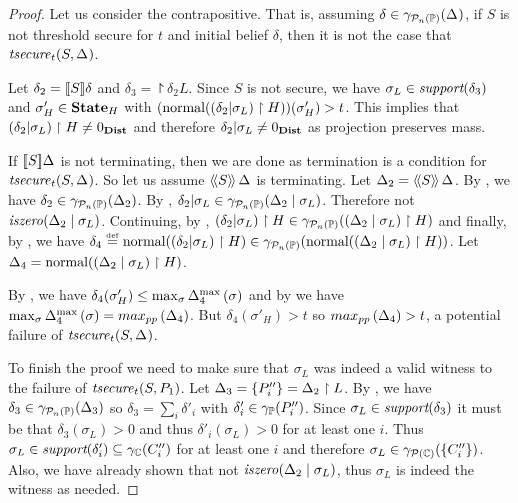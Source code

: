 \begin{proof} Let us consider the contrapositive. That is, assuming
  $ \delta \in \ppsconc{\pps{}} $, if $ S $ is not threshold secure for
  $ t $ and initial belief $ \delta $, then it is not the case that
  $ \abspolicy{S}{\pps{}}{t} $.

Let $ \delta_2 = \eval{S}{\delta} $ and $ \delta_3
= \project{\delta_2}{L} $. Since $ S $ is not secure, we have
$ \sigma_L \in \support{\delta_3} $ and
$ \sigma'_H \in \states_H $ with $
(\normal{\project{\paren{\dcond{\delta_2}{\sigma_L}}}{H}})(\sigma'_H) >
t $. This implies that
$ \project{\paren{\dcond{\delta_2}{\sigma_L}}}{H} \neq \distzero $ and
therefore $ \dcond{\delta_2}{\sigma_L} \neq \distzero $ as projection
preserves mass.

If $ \pevalp{S}{\pps{}} $ is not terminating, then we are done as
termination is a condition for $ \abspolicy{S}{\pps{}}{t} $. So let us
assume $ \abspevalp{S}{\pps{}} $ is terminating. Let $ \pps{2}
= \abspevalp{S}{\pps{}} $. By , we have
$ \delta_2 \in \ppsconc{\pps{2}} $. By ,
$ \dcond{\delta_2}{\sigma_L} \in \ppsconc{\absdcond{\pps{2}}{\sigma_L}}
$. Therefore not $ \iszero{\absdcond{\pps{2}}{\sigma_L}}
$. Continuing, by ,
$ \project{ \paren{\dcond{\delta_2}{\sigma_L}}}{H} \in \ppsconc{\project{\paren{\absdcond{\pps{2}}{\sigma_L}}}{H}}
$ and finally, by , we have
$ \delta_4 \defeq \normal{\project{\paren{\dcond{\delta_2}{\sigma_L}}}{H}} \in \ppsconc{\normal{\project{\paren{\absdcond{\pps{2}}{\sigma_L}}}{H}}}
$. Let $ \pps{4}
= \normal{\project{\paren{\absdcond{\pps{2}}{\sigma_L}}}{H}} $.

By , we have
$ \delta_4(\sigma'_H) \leq \max_{\sigma}\ppsprob{\pps{4}}{\sigma} $
and by  we have
$ \max_{\sigma}\ppsprob{\pps{4}}{\sigma} = \ppsmax{\pps{4}} $.  But
$ \delta_4(\sigma'_H) > t $ so $ \ppsmax{\pps{4}} > t $, a potential
failure of $\abspolicy{S}{\pps{}}{t} $.

To finish the proof we need to make sure that $ \sigma_L $ was indeed
a valid witness to the failure of $ \abspolicy{S}{\pp{1}}{t} $. Let
$ \pps{3} = \set{\pp{i}''} = \project{\pps{2}}{L}
$. By , we have $ \delta_3 \in \ppsconc{\pps{3}}
$ so $ \delta_3 = \sum_i \delta'_i $ with
$ \delta'_i \in \ppconc{\pp{i}''} $. Since
$ \sigma_L \in \support{\delta_3} $ it must be that
$ \delta_3(\sigma_L) > 0 $ and thus $ \delta'_i(\sigma_L) > 0 $ for at
least one $ i $. Thus
$ \sigma_L \in \support{\delta'_i} \subseteq \pconc{\poly''_i} $ for
at least one $ i $ and therefore
$ \sigma_L \in \psconc{\set{\poly''_i}} $. Also, we have already
shown that not $ \iszero{\absdcond{\pps{2}}{\sigma_L}} $, thus
$ \sigma_L $ is indeed the witness as needed.
\end{proof}

